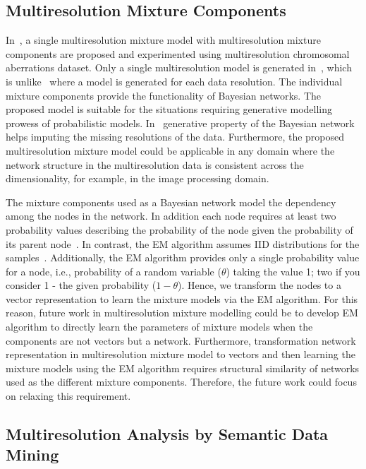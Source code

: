 \subsection{Multiresolution Mixture Components}
\label{ss:dmultiresmdl}

In~, a single multiresolution mixture model with multiresolution 
mixture components are proposed and experimented using multiresolution
chromosomal aberrations dataset. Only a single multiresolution model is generated 
in~, which is unlike~ where a model is generated for 
each data resolution. The individual mixture components provide the functionality
of Bayesian networks. The proposed model is suitable for the situations 
requiring generative modelling prowess of probabilistic models. In~ 
generative property of the Bayesian network helps imputing the missing 
resolutions of the data. Furthermore, the proposed multiresolution mixture
model could be applicable in any domain where the network structure in 
the multiresolution data is consistent across the dimensionality, for 
example, in the image processing domain.


The mixture components used as a Bayesian network model the 
dependency among the nodes in the network. In addition each 
node requires at least two probability values describing the 
probability of the node given the probability of its parent 
node~\cite{barberBRML12}. In contrast, the EM algorithm
assumes IID distributions for the 
samples~\cite{McLachlan2008emext}. Additionally, the EM 
algorithm provides only a single probability value for a 
node, i.e.,  probability of a random variable ($\theta$) 
taking the value 1; two if you consider 1 - the given 
probability ($1-\theta$). Hence, we transform the nodes
to a vector representation to learn the mixture models via 
the EM algorithm. For this reason, future work in 
multiresolution mixture modelling could be to develop EM 
algorithm to directly learn the parameters of mixture 
models when the components are not vectors but a network. 
Furthermore, transformation network representation in 
multiresolution mixture model to vectors and then learning 
the mixture models using the EM algorithm requires structural 
similarity of networks used as the different mixture components. 
Therefore, the future work could focus on relaxing 
this requirement.

\subsection{Multiresolution Analysis by Semantic Data Mining}
\label{ss:dsemantic}

